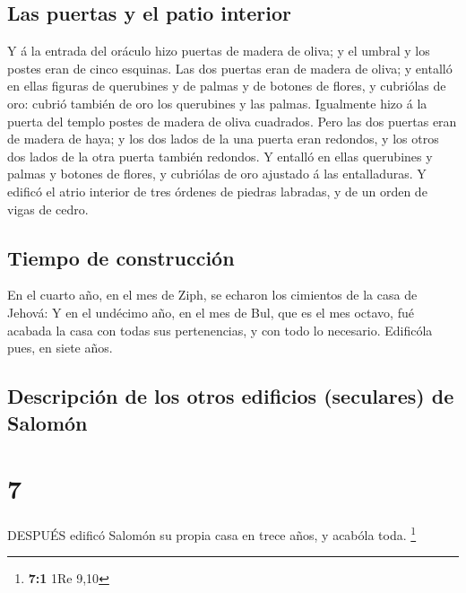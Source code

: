 \hypertarget{las-puertas-y-el-patio-interior}{%
\subsection{Las puertas y el patio
interior}\label{las-puertas-y-el-patio-interior}}

 Y á la entrada del oráculo hizo puertas de madera de
oliva; y el umbral y los postes eran de cinco esquinas. 
Las dos puertas eran de madera de oliva; y entalló en ellas figuras de
querubines y de palmas y de botones de flores, y cubriólas de oro:
cubrió también de oro los querubines y las palmas. 
Igualmente hizo á la puerta del templo postes de madera de oliva
cuadrados.  Pero las dos puertas eran de madera de haya; y
los dos lados de la una puerta eran redondos, y los otros dos lados de
la otra puerta también redondos.  Y entalló en ellas
querubines y palmas y botones de flores, y cubriólas de oro ajustado á
las entalladuras.  Y edificó el atrio interior de tres
órdenes de piedras labradas, y de un orden de vigas de cedro.

\hypertarget{tiempo-de-construcciuxf3n}{%
\subsection{Tiempo de construcción}\label{tiempo-de-construcciuxf3n}}

 En el cuarto año, en el mes de Ziph, se echaron los
cimientos de la casa de Jehová:  Y en el undécimo año, en
el mes de Bul, que es el mes octavo, fué acabada la casa con todas sus
pertenencias, y con todo lo necesario. Edificóla pues, en siete años.

\hypertarget{descripciuxf3n-de-los-otros-edificios-seculares-de-salomuxf3n}{%
\subsection{Descripción de los otros edificios (seculares) de
Salomón}\label{descripciuxf3n-de-los-otros-edificios-seculares-de-salomuxf3n}}

\hypertarget{section-6}{%
\section{7}\label{section-6}}

 DESPUÉS edificó Salomón su propia casa en trece años, y
acabóla toda. \footnote{\textbf{7:1} 1Re 9,10}

